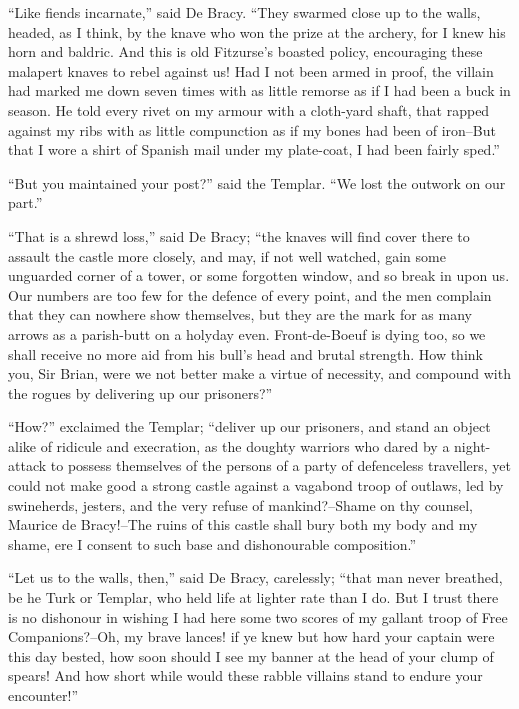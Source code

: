 ``Like fiends incarnate,'' said De Bracy. ``They swarmed close up to the
walls, headed, as I think, by the knave who won the prize at the
archery, for I knew his horn and baldric. And this is old Fitzurse's
boasted policy, encouraging these malapert knaves to rebel against us!
Had I not been armed in proof, the villain had marked me down seven
times with as little remorse as if I had been a buck in season. He told
every rivet on my armour with a cloth-yard shaft, that rapped against my
ribs with as little compunction as if my bones had been of iron--But
that I wore a shirt of Spanish mail under my plate-coat, I had been
fairly sped.''

``But you maintained your post?'' said the Templar. ``We lost the
outwork on our part.''

``That is a shrewd loss,'' said De Bracy; ``the knaves will find cover
there to assault the castle more closely, and may, if not well watched,
gain some unguarded corner of a tower, or some forgotten window, and so
break in upon us. Our numbers are too few for the defence of every
point, and the men complain that they can nowhere show themselves, but
they are the mark for as many arrows as a parish-butt on a holyday even.
Front-de-Boeuf is dying too, so we shall receive no more aid from his
bull's head and brutal strength. How think you, Sir Brian, were we not
better make a virtue of necessity, and compound with the rogues by
delivering up our prisoners?''

``How?'' exclaimed the Templar; ``deliver up our prisoners, and stand an
object alike of ridicule and execration, as the doughty warriors who
dared by a night-attack to possess themselves of the persons of a party
of defenceless travellers, yet could not make good a strong castle
against a vagabond troop of outlaws, led by swineherds, jesters, and the
very refuse of mankind?--Shame on thy counsel, Maurice de Bracy!--The
ruins of this castle shall bury both my body and my shame, ere I consent
to such base and dishonourable composition.''

``Let us to the walls, then,'' said De Bracy, carelessly; ``that man
never breathed, be he Turk or Templar, who held life at lighter rate
than I do. But I trust there is no dishonour in wishing I had here some
two scores of my gallant troop of Free Companions?--Oh, my brave lances!
if ye knew but how hard your captain were this day bested, how soon
should I see my banner at the head of your clump of spears! And how
short while would these rabble villains stand to endure your
encounter!''

